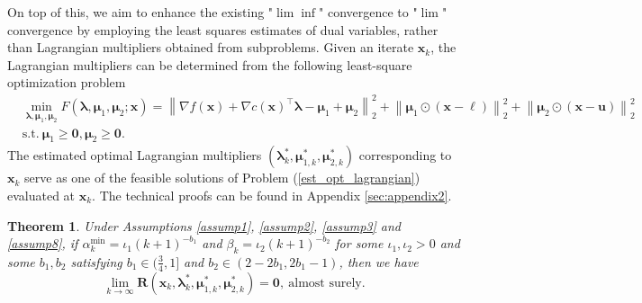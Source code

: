 \documentclass[aos]{imsart}
\numberwithin{equation}{section}
\theoremstyle{plain}
\newtheorem{theorem}{Theorem}
\begin{document}
On top of this, we aim to enhance the existing "$\lim \inf$" convergence to "$\lim$" convergence by employing the least squares estimates of dual variables, rather than Lagrangian multipliers obtained from subproblems. Given an iterate $\bm{x}_k$, the Lagrangian multipliers can be determined from the following least-square optimization problem
\begin{equation}
\label{est_opt_lagrangian}
\begin{split}
    & \min_{\bm{\lambda}, \bm{\mu}_{1}, \bm{\mu}_{2}} F(\bm{\lambda}, \bm{\mu}_{1}, \bm{\mu}_2; \bm{x}) =  \left\| \nabla f(\bm{x}) + \nabla c(\bm{x})^{\top} \bm{\lambda} - \bm{\mu}_{1} + \bm{\mu}_2 \right\|_2^2 + \left\| \bm{\mu}_{1} \odot \left( \bm{x} - \bm{\ell} \right) \right\|_2^2 + \left\| \bm{\mu}_{2} \odot \left( \bm{x} - \bm{u} \right) \right\|_2^2 \\
    & \text{s.t.}~ \bm{\mu}_{1} \geq \bm{0}, \bm{\mu}_2 \geq \bm{0}.
\end{split}
\end{equation}
The estimated optimal Lagrangian multipliers   $(\bm{\lambda}_{k}^{*}, \bm{\mu}_{1,k}^{*}, \bm{\mu}_{2,k}^{*})$ corresponding to $\bm{x}_k$ serve as one of the feasible solutions of Problem (\ref{est_opt_lagrangian}) evaluated at $\bm{x}_k$. The technical proofs can be found in Appendix \ref{sec:appendix2}.

\begin{theorem}\label{theorem_lim}
    Under Assumptions \ref{assump1}, \ref{assump2}, \ref{assump3} and \ref{assump8}, if $\alpha_k^{\text{min}} = \iota_1 (k+1)^{-b_1}$ and $\beta_k = \iota_2 (k+1)^{-b_2}$ for some $\iota_1, \iota_2 >0$ and some $b_1, b_2$ satisfying $b_1 \in (\frac{3}{4},1]$ and $b_2 \in \left( 2-2b_1,2b_1-1\right)$, then we have
     \begin{equation}
        \lim_{k \to \infty} \bm{R}(\bm{x}_{k},\bm{\lambda}_{k}^{*},\bm{\mu}_{1,k}^{*},\bm{\mu}_{2,k}^{*}) = \bm{0},~\text{almost surely}.
\end{equation}
    
\end{theorem}
\end{document}
